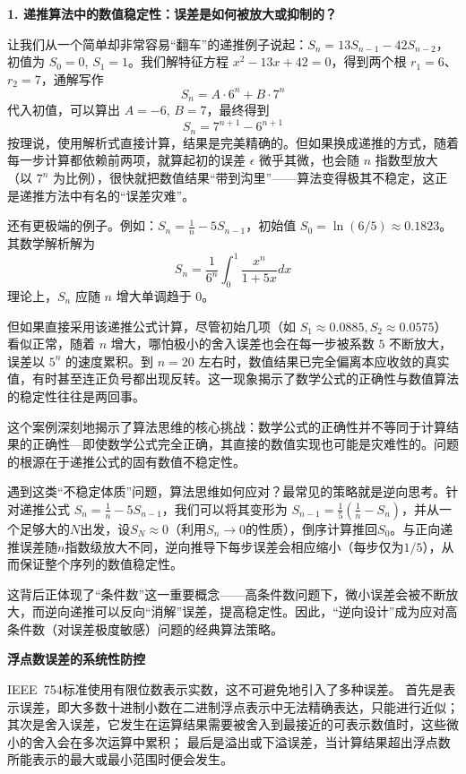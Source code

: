 \textbf{1. 递推算法中的数值稳定性：误差是如何被放大或抑制的？}

让我们从一个简单却非常容易“翻车”的递推例子说起：$S_n = 13S_{n-1} - 42S_{n-2}$，初值为 $S_0 = 0$, $S_1 = 1$。我们解特征方程 $x^2 - 13x + 42 = 0$，得到两个根 $r_1 = 6$、$r_2 = 7$，通解写作
$$S_n = A \cdot 6^n + B \cdot 7^n$$
代入初值，可以算出 $A = -6$, $B = 7$，最终得到
$$S_n = 7^{n+1} - 6^{n+1}$$
按理说，使用解析式直接计算，结果是完美精确的。但如果换成递推的方式，随着每一步计算都依赖前两项，就算起初的误差 $\epsilon$ 微乎其微，也会随 $n$ 指数型放大（以 $7^n$ 为比例），很快就把数值结果“带到沟里”——算法变得极其不稳定，这正是递推方法中有名的“误差灾难”。

还有更极端的例子。例如：$S_n = \frac{1}{n} - 5S_{n-1}$，初始值 $S_0 = \ln(6/5) \approx 0.1823$。其数学解析解为
$$S_n = \frac{1}{6^n} \int_0^1 \frac{x^n}{1+5x} dx$$
理论上，$S_n$ 应随 $n$ 增大单调趋于 $0$。

但如果直接采用该递推公式计算，尽管初始几项（如 $S_1 \approx 0.0885, S_2 \approx 0.0575$）看似正常，随着 $n$ 增大，哪怕极小的舍入误差也会在每一步被系数 $5$ 不断放大，误差以 $5^n$ 的速度累积。到 $n=20$ 左右时，数值结果已完全偏离本应收敛的真实值，有时甚至连正负号都出现反转。这一现象揭示了数学公式的正确性与数值算法的稳定性往往是两回事。

这个案例深刻地揭示了算法思维的核心挑战：数学公式的正确性并不等同于计算结果的正确性---即使数学公式完全正确，其直接的数值实现也可能是灾难性的。问题的根源在于递推公式的固有数值不稳定性。

遇到这类“不稳定体质”问题，算法思维如何应对？最常见的策略就是逆向思考。针对递推公式 $S_n = \frac{1}{n} - 5S_{n-1}$，我们可以将其变形为 $S_{n-1} = \frac{1}{5}\left(\frac{1}{n} - S_n\right)$，并从一个足够大的$N$出发，设$S_N \approx 0$（利用$S_n \to 0$的性质），倒序计算推回$S_0$。与正向递推误差随$n$指数级放大不同，逆向推导下每步误差会相应缩小（每步仅为$1/5$），从而保证整个序列的数值稳定性。

这背后正体现了“条件数”这一重要概念——高条件数问题下，微小误差会被不断放大，而逆向递推可以反向“消解”误差，提高稳定性。因此，“逆向设计”成为应对高条件数（对误差极度敏感）问题的经典算法策略。

\textbf{浮点数误差的系统性防控}

IEEE 754标准使用有限位数表示实数，这不可避免地引入了多种误差。
首先是表示误差，即大多数十进制小数在二进制浮点表示中无法精确表达，只能进行近似；
其次是舍入误差，它发生在运算结果需要被舍入到最接近的可表示数值时，这些微小的舍入会在多次运算中累积；
最后是溢出或下溢误差，当计算结果超出浮点数所能表示的最大或最小范围时便会发生。

